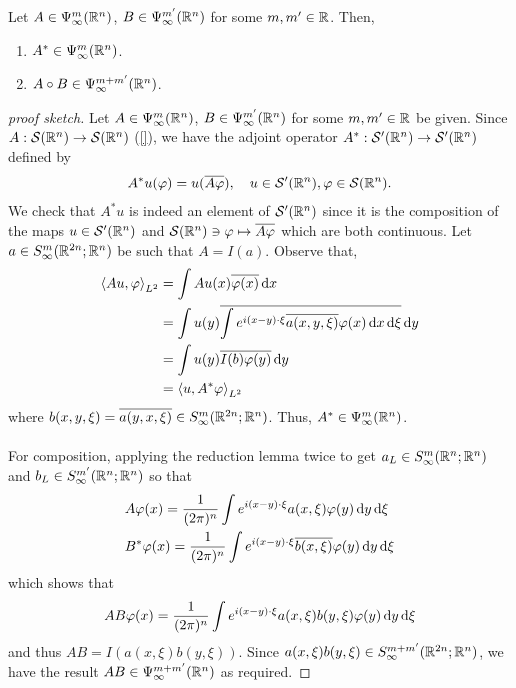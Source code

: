 \documentclass[12pt]{article}
\begin{document}
\begin{ftheorem}[Composition]
    Let $A \in \Psi^{m}_\infty(\R^n)$, $B \in \Psi^{m'}_\infty(\R^n)$ for some $m, m' \in \R$. Then, 
    \begin{enumerate}
        \item $A^* \in \Psi^{m}_\infty(\R^n)$.
        \item $A \circ B \in \Psi^{m + m'}_\infty(\R^n)$. 
    \end{enumerate}
\end{ftheorem}
\begin{proof}[proof sketch]
    Let $A \in \Psi^{m}_\infty(\R^n)$, $B \in \Psi^{m'}_\infty(\R^n)$ for some $m, m' \in \R$ be given. 
    Since $A : \sch(\R^n) \to \sch(\R^n)$ (\ref{}), we have the adjoint operator $A^* : \sch'(\R^n) \to \sch'(\R^n)$ defined by 
    \begin{align*}
        A^*u(\varphi) = u(\overline{A\varphi}), \quad u \in \sch'(\R^n), \varphi \in \sch(\R^n). 
    \end{align*}
    We check that $A^*u$ is indeed an element of $\sch'(\R^n)$ since it is the composition of the maps $u \in \sch'(\R^n)$ and $\sch(\R^n) \ni \varphi \mapsto \overline{A\varphi}$ which are both continuous.  Let $a \in S^{m}_\infty(\R^{2n}; \R^n)$ be such that $A = I(a)$. Observe that, 
    \begin{align*}
        \inprod[Au, \varphi]_{L^2} 
        & = \int Au(x) \overline{\varphi(x)}\d[x]  \\
        & = \int u(y) \overline{\int e^{i(x -y) \cdot \xi} \overline{a(x, y, \xi)} \varphi(x) \d[x] \d[\xi]} \d[y] \\
        & = \int u(y) \overline{I(b) \varphi(y)}\d[y]\\
        & = \inprod[u, A^*\varphi]_{L^2}
    \end{align*}
    where $b(x, y, \xi) = \overline{a(y, x, \xi)} \in S^{m}_\infty(\R^{2n}; \R^n)$. Thus, $A^* \in \Psi^{m}_\infty(\R^n)$. \\
    \\
    For composition, applying the reduction lemma twice to get $a_L \in S^{m}_\infty(\R^{n}; \R^n)$ and $b_L \in S^{m'}_\infty(\R^{n}; \R^n)$ so that 
    \begin{align*}
        &A \varphi(x) = \frac{1}{(2\pi)^n} \int e^{i(x -y) \cdot \xi} a(x, \xi) \varphi(y) \d[y] \d[\xi] \\
        &B^* \varphi(x) = \frac{1}{(2\pi)^n} \int e^{i(x -y) \cdot \xi} \overline{b(x, \xi) }\varphi(y) \d[y] \d[\xi]
    \end{align*}
    which shows that 
    \begin{align*}
        AB\varphi(x) = \frac{1}{(2\pi)^n} \int e^{i(x -y) \cdot \xi} a(x, \xi) b(y, \xi) \varphi(y) \d[y] \d[\xi]
    \end{align*}
    and thus $AB = I(a(x, \xi) b(y, \xi))$. Since $a(x, \xi)b(y, \xi) \in S^{m + m'}_\infty(\R^{2n}; \R^n)$, we have the result $AB \in \Psi^{m + m'}_\infty(\R^n)$ as required. 
    
\end{proof}
\end{document}
